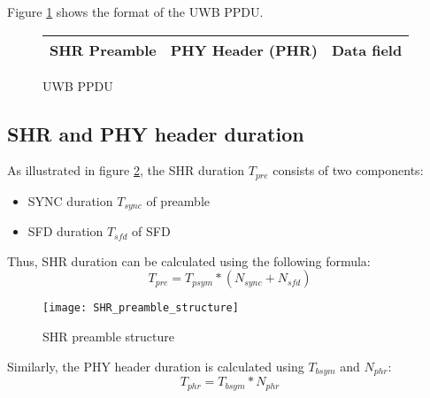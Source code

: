 \documentclass[./main.tex]{subfiles}
\begin{document}
Figure \ref{fig:UWB PPDU} shows the format of the UWB PPDU.
\begin{figure}[ht]
    \centering
    \begin{tabular}{ |M{0.2}|M{0.15}|M{0.5}|} 
        \hline
        \textbf{SHR Preamble} & \textbf{PHY Header (PHR)} & \textbf{Data field}\\
        \hline
    \end{tabular}
    \caption{UWB PPDU}
    \label{fig:UWB PPDU}
\end{figure}

\subsection{SHR and PHY header duration}

As illustrated in figure \ref{fig:SHR preamble structure}, the SHR duration $T_{pre}$ consists of two components:
\begin{itemize}
    \item SYNC duration $T_{sync}$ of preamble
    \item SFD duration $T_{sfd}$ of SFD
\end{itemize}
Thus, SHR duration can be calculated using the following formula:
\begin{equation}
    T_{pre} = T_{psym} * (N_{sync} + N_{sfd})
\end{equation}

\begin{figure}[ht]
    \begin{center}
        \texttt{[image: SHR\_preamble\_structure]}
    \end{center}
    \caption{SHR preamble structure}
    \label{fig:SHR preamble structure}
\end{figure}

Similarly, the PHY header duration is calculated using $T_{bsym}$ and $N_{phr}$:
\begin{equation}
    T_{phr} = T_{bsym} * N_{phr}
\end{equation}
\end{document}
